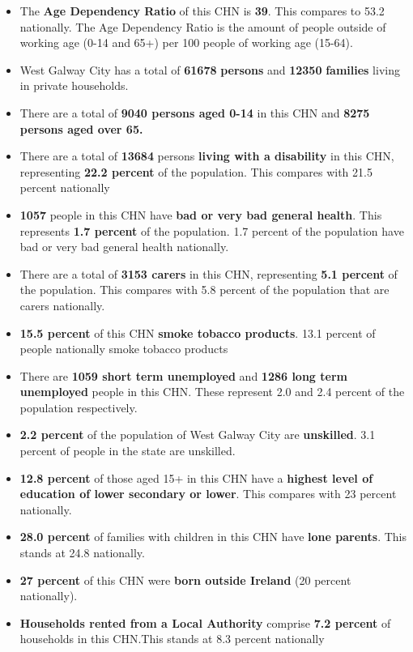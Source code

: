 \documentclass{article}
\begin{document}
\begin{itemize}

\item The \textbf{Age Dependency Ratio} of this CHN is  \textbf{39}. This compares to 53.2 nationally. The Age Dependency Ratio is the amount of people outside of working age (0-14 and 65+) per 100 people of working age (15-64). 

\item West Galway City has a total of \textbf{\num{61678}} \textbf{persons} and  \textbf{\num{12350}} \textbf{families} living in private households.

\item There are a total of \textbf{\num{9040} persons aged 0-14} in this CHN and \textbf{\num{8275} persons aged over 65.} 

\item There are a total of \textbf{\num{13684}} persons \textbf{living with a disability} in this CHN, representing \textbf{22.2 percent} of the population. This compares with  21.5 percent nationally

\item \textbf{\num{1057}} people in this CHN have \textbf{bad or very bad general health}. This represents \textbf{1.7 percent} of the population. 1.7 percent of the population have bad or very bad general health nationally. 

\item There are a total of \textbf{\num{3153} carers} in this CHN, representing \textbf{5.1 percent} of the population. This compares with 5.8 percent of the population that are carers nationally. 

\item \textbf{15.5 percent} of this CHN \textbf{smoke tobacco products}. 13.1 percent of people nationally smoke tobacco products

\item There are \textbf{\num{1059} short term unemployed} and \textbf{\num{1286} long term unemployed} people in this CHN. These represent 2.0 and 2.4 percent of the population respectively.

\item  \textbf{2.2 percent} of the population of West Galway City are \textbf{unskilled}. 3.1 percent of people in the state are unskilled.

\item \textbf{12.8 percent} of those aged 15+ in this CHN have a \textbf{highest level of education of lower secondary or lower}. This compares with 23 percent nationally. 

\item \textbf{28.0 percent} of families with children in this CHN have \textbf{lone parents}. This stands at 24.8 nationally.

\item \textbf{27 percent} of this CHN were \textbf{born outside Ireland} (20 percent nationally).

\item \textbf{Households rented from a Local Authority} comprise \textbf{7.2 percent} of households in this CHN.This stands at 8.3 percent nationally

\end{itemize}
\end{document}
